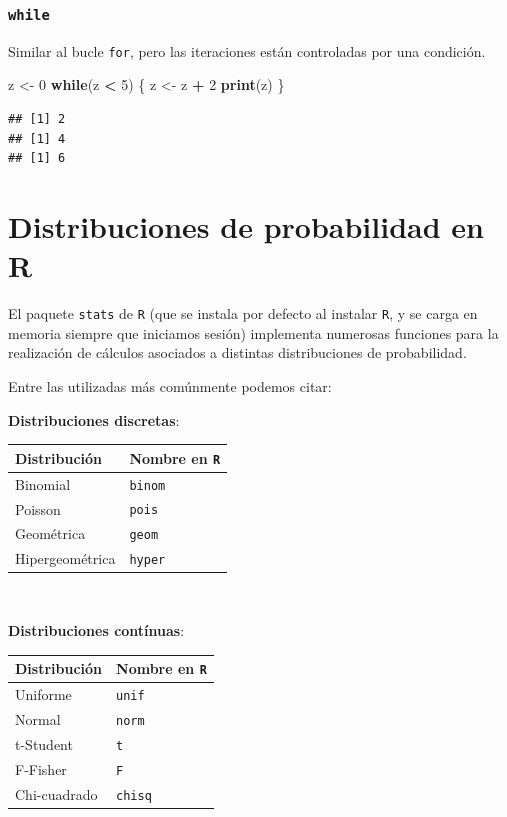 \documentclass[]{book}
\newenvironment{Shaded}{\begin{snugshade}}{\end{snugshade}}
\newcommand{\KeywordTok}[1]{\textcolor[rgb]{0.13,0.29,0.53}{\textbf{#1}}}
\newcommand{\DecValTok}[1]{\textcolor[rgb]{0.00,0.00,0.81}{#1}}
\newcommand{\StringTok}[1]{\textcolor[rgb]{0.31,0.60,0.02}{#1}}
\newcommand{\ControlFlowTok}[1]{\textcolor[rgb]{0.13,0.29,0.53}{\textbf{#1}}}
\newcommand{\OperatorTok}[1]{\textcolor[rgb]{0.81,0.36,0.00}{\textbf{#1}}}
\newcommand{\NormalTok}[1]{#1}
\begin{document}
\subsection{\texorpdfstring{\texttt{while}}{while}}\label{while}

Similar al bucle \texttt{for}, pero las iteraciones están controladas
por una condición.

\begin{Shaded}
\begin{Highlighting}[]
\NormalTok{z <-}\StringTok{ }\DecValTok{0}
\ControlFlowTok{while}\NormalTok{(z }\OperatorTok{<}\StringTok{ }\DecValTok{5}\NormalTok{) \{}
\NormalTok{    z <-}\StringTok{ }\NormalTok{z }\OperatorTok{+}\StringTok{ }\DecValTok{2}
    \KeywordTok{print}\NormalTok{(z) }
\NormalTok{\}}
\end{Highlighting}
\end{Shaded}

\begin{verbatim}
## [1] 2
## [1] 4
## [1] 6
\end{verbatim}

\chapter{Distribuciones de probabilidad en
R}\label{distribuciones-de-probabilidad-en-r}

El paquete \texttt{stats} de \texttt{R} (que se instala por defecto al
instalar \texttt{R}, y se carga en memoria siempre que iniciamos sesión)
implementa numerosas funciones para la realización de cálculos asociados
a distintas distribuciones de probabilidad.

Entre las utilizadas más comúnmente podemos citar:

\textbf{Distribuciones discretas}:

\begin{longtable}[]{@{}ll@{}}
\toprule
Distribución & Nombre en \texttt{R}\tabularnewline
\midrule
\endhead
Binomial & \texttt{binom}\tabularnewline
Poisson & \texttt{pois}\tabularnewline
Geométrica & \texttt{geom}\tabularnewline
Hipergeométrica & \texttt{hyper}\tabularnewline
\bottomrule
\end{longtable}

~

\textbf{Distribuciones contínuas}:

\begin{longtable}[]{@{}ll@{}}
\toprule
Distribución & Nombre en \texttt{R}\tabularnewline
\midrule
\endhead
Uniforme & \texttt{unif}\tabularnewline
Normal & \texttt{norm}\tabularnewline
t-Student & \texttt{t}\tabularnewline
F-Fisher & \texttt{F}\tabularnewline
Chi-cuadrado & \texttt{chisq}\tabularnewline
\bottomrule
\end{longtable}
\end{document}
